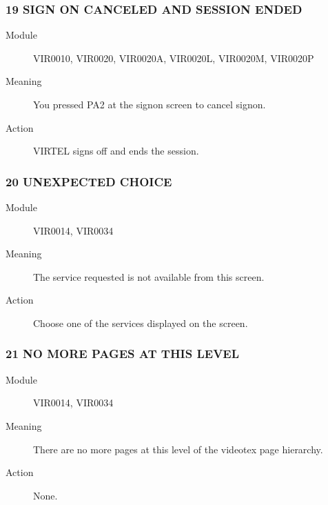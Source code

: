 \documentclass[letterpaper,10pt,english]{sphinxmanual}
\begin{document}
\subsubsection{19 SIGN ON CANCELED AND SESSION ENDED}
\label{\detokenize{messages:sign-on-canceled-and-session-ended}}\begin{description}
\item[{Module}] \leavevmode
VIR0010, VIR0020, VIR0020A, VIR0020L, VIR0020M, VIR0020P

\item[{Meaning}] \leavevmode
You pressed PA2 at the signon screen to cancel signon.

\item[{Action}] \leavevmode
VIRTEL signs off and ends the session.

\end{description}


\subsubsection{20 UNEXPECTED CHOICE}
\label{\detokenize{messages:unexpected-choice}}\begin{description}
\item[{Module}] \leavevmode
VIR0014, VIR0034

\item[{Meaning}] \leavevmode
The service requested is not available from this screen.

\item[{Action}] \leavevmode
Choose one of the services displayed on the screen.

\end{description}


\subsubsection{21 NO MORE PAGES AT THIS LEVEL}
\label{\detokenize{messages:no-more-pages-at-this-level}}\begin{description}
\item[{Module}] \leavevmode
VIR0014, VIR0034

\item[{Meaning}] \leavevmode
There are no more pages at this level of the videotex page hierarchy.

\item[{Action}] \leavevmode
None.

\end{description}
\end{document}
